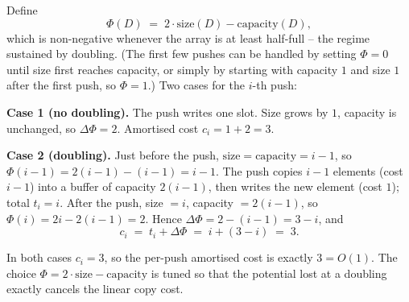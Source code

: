 \begin{example}
\label{ex:dyn_array_potential}
Define
\[
  \Phi(D) \;=\; 2 \cdot \mathrm{size}(D) - \mathrm{capacity}(D),
\]
which is non-negative whenever the array is at least half-full -- the regime sustained by doubling. (The first few pushes can be handled by setting $\Phi = 0$ until size first reaches capacity, or simply by starting with capacity $1$ and size $1$ after the first push, so $\Phi = 1$.) Two cases for the $i$-th push:

\smallskip
\textbf{Case 1 (no doubling).} The push writes one slot. Size grows by $1$, capacity is unchanged, so $\Delta\Phi = 2$. Amortised cost $c_i = 1 + 2 = 3$.

\smallskip
\textbf{Case 2 (doubling).} Just before the push, $\mathrm{size} = \mathrm{capacity} = i - 1$, so $\Phi(i-1) = 2(i-1) - (i-1) = i-1$. The push copies $i-1$ elements (cost $i-1$) into a buffer of capacity $2(i-1)$, then writes the new element (cost $1$); total $t_i = i$. After the push, size $= i$, capacity $= 2(i-1)$, so $\Phi(i) = 2i - 2(i-1) = 2$. Hence $\Delta\Phi = 2 - (i-1) = 3 - i$, and
\[
  c_i \;=\; t_i + \Delta\Phi \;=\; i + (3 - i) \;=\; 3.
\]

\smallskip
\noindent In both cases $c_i = 3$, so the per-push amortised cost is exactly $3 = O(1)$. The choice $\Phi = 2 \cdot \mathrm{size} - \mathrm{capacity}$ is tuned so that the potential lost at a doubling exactly cancels the linear copy cost.
\end{example}

